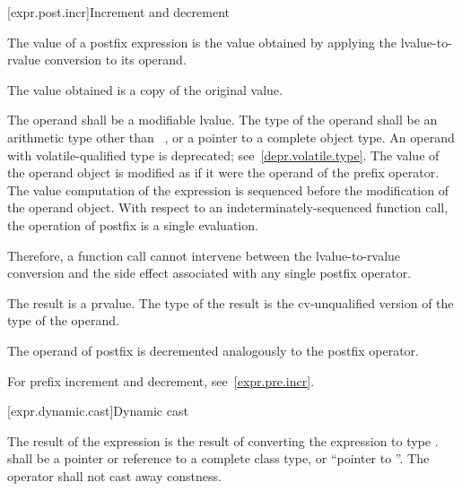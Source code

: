 [expr.post.incr]{Increment and decrement}

\pnum
{}%
%
%
%
The value of a postfix \tcode{++} expression is the value obtained by
applying the lvalue-to-rvalue conversion to its operand.
\begin{note}
The value obtained is a copy of the original value.
\end{note}
The operand shall be a modifiable lvalue. The type of the operand shall
be an arithmetic type other than \cv{}~,
or a pointer to a complete object type.
An operand with volatile-qualified type is deprecated;
see~\ref{depr.volatile.type}.
The value of the operand object is modified
as if it were the operand of the prefix \tcode{++} operator.
The
%
value computation of the \tcode{++} expression is sequenced before the
modification of the operand object. With respect to an
indeterminately-sequenced function call, the operation of postfix
\tcode{++} is
a single evaluation.
\begin{note}
Therefore, a function call cannot intervene between the
lvalue-to-rvalue conversion and the side effect associated with any
single postfix \tcode{++} operator.
\end{note}
The result is a prvalue. The type of the result is the cv-unqualified
version of the type of the operand.

\pnum
{}%
%
%
%
The operand of postfix \tcode{--} is decremented analogously to the
postfix \tcode{++} operator.
\begin{note}
For prefix increment and decrement, see~\ref{expr.pre.incr}.
\end{note}

[expr.dynamic.cast]{Dynamic cast}

\pnum
{}%
%
The result of the expression  is the result of
converting the expression  to type .
%
 shall be a pointer or reference to a complete class type, or
``pointer to \cv{} ''. The  operator shall not cast
away constness.

